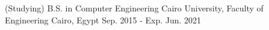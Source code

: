 

\begin{cventries}

  \cvedu
    {(Studying) B.S. in Computer Engineering} %
    {Cairo University, Faculty of Engineering} %
    {Cairo, Egypt} %
    {Sep. 2015 - Exp. Jun. 2021} %
\end{cventries}
